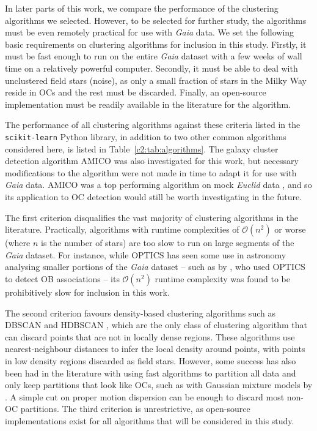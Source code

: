 In later parts of this work, we compare the performance of the clustering algorithms we selected. However, to be selected for further study, the algorithms must be even remotely practical for use with \emph{Gaia} data. We set the following basic requirements on clustering algorithms for inclusion in this study. Firstly, it must be fast enough to run on the entire \emph{Gaia} dataset with a few weeks of wall time on a relatively powerful computer. Secondly, it must be able to deal with unclustered field stars (noise), as only a small fraction of stars in the Milky Way reside in OCs and the rest must be discarded. Finally, an open-source implementation must be readily available in the literature for the algorithm.

The performance of all clustering algorithms against these criteria listed in the \texttt{scikit-learn} \citep{pedregosa_scikit-learn_2011} Python library, in addition to two other common algorithms considered here, is listed in Table~\ref{c2:tab:algorithms}. The galaxy cluster detection algorithm AMICO \citep[Adaptive Matched Identifier of Clustered Objects,][]{bellagamba_amico:_2018} was also investigated for this work, but necessary modifications to the algorithm were not made in time to adapt it for use with \emph{Gaia} data. AMICO was a top performing algorithm on mock \emph{Euclid} data \citep{euclid_collaboration_euclid_2019}, and so its application to OC detection would still be worth investigating in the future.

The first criterion disqualifies the vast majority of clustering algorithms in the literature. Practically, algorithms with runtime complexities of $\mathcal{O} ( n^2 )$ or worse (where $n$ is the number of stars) are too slow to run on large segments of the \emph{Gaia} dataset. For instance, while OPTICS \citep{ankerst_optics_1999} has seen some use in astronomy analysing smaller portions of the \emph{Gaia} dataset -- such as by \cite{ward_not_2019}, who used OPTICS to detect OB associations -- its $\mathcal{O} ( n^2 )$ runtime complexity was found to be prohibitively slow for inclusion in this work.

The second criterion favours density-based clustering algorithms such as DBSCAN \citep[Density-Based Spatial Clustering of Applications with Noise,][]{ester_density-based_1996} and HDBSCAN \citep[Hierarchical DBSCAN,][]{hutchison_hdbscan_2013}, which are the  only class of clustering algorithm that can discard points that are not in locally dense regions. These algorithms use nearest-neighbour distances to infer the local density around points, with points in low density regions discarded as field stars. However, some success has also been had in the literature with using fast algorithms to partition all data and only keep partitions that look like OCs, such as with Gaussian mixture models \citep[hereafter GMMs]{dempster_maximum_1977} by \cite{cantat-gaudin_gaia_2019}. A simple cut on proper motion dispersion can be enough to discard most non-OC partitions. The third criterion is unrestrictive, as open-source implementations exist for all algorithms that will be considered in this study.

